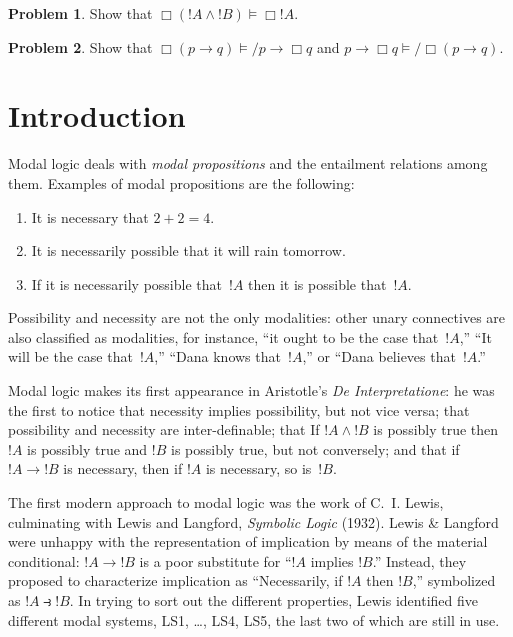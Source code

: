 \documentclass[10pt,a4paper]{article}
\theoremstyle{plain}
\theoremstyle{definition}
\newtheorem{prob}{Problem}[section]
\theoremstyle{remark}
\newcommand*{\olfileid}[3]{}
\newcommand*{\olsection}[1]{\section*{#1}}
\providecommand{\lif}{\mathbin{\rightarrow}}
\providecommand{\Entails}{\mathrel{\models}}
\providecommand{\Log}{\ensuremath{\mathrm{L}}}
\begin{document}
\begin{prob}
  Show that $\Box (!A \land !B) \Entails \Box !A$.
\end{prob}

\begin{prob}
  Show that $\Box (p \lif q) \Entails/ p \lif \Box q$ and $p \lif \Box
  q \Entails/\Box (p \lif q)$.
\end{prob}





\olfileid{nml}{syn}{int}

\olsection{Introduction}

Modal logic deals with \emph{modal propositions} and the entailment
relations among them. Examples of modal propositions are the
following:
\begin{enumerate}
\item It is necessary that $2+2=4$.
\item It is necessarily possible that it will rain tomorrow.
\item If it is necessarily possible that~$!A$ then it is possible
  that~$!A$.
\end{enumerate}
Possibility and necessity are not the only modalities: other unary
connectives are also classified as modalities, for instance, ``it
ought to be the case that~$!A$,'' ``It will be the case that~$!A$,''
``Dana knows that~$!A$,'' or ``Dana believes that~$!A$.''

Modal logic makes its first appearance in Aristotle's \emph{De
  Interpretatione}: he was the first to notice that necessity implies
possibility, but not vice versa; that possibility and necessity are
inter-definable; that If $!A \land !B$ is possibly true then
$!A$ is possibly true and $!B$ is possibly true, but not
conversely; and that if $!A \to !B$ is necessary, then if
$!A$ is necessary, so is~$!B$.

The first modern approach to modal logic was the work of C.~I. Lewis,
culminating with Lewis and Langford, \emph{Symbolic Logic}
(1932). Lewis \& Langford were unhappy with the representation of
implication by means of the material conditional: $!A \lif !B$
is a poor substitute for ``$!A$ implies $!B$.'' Instead, they
proposed to characterize implication as ``Necessarily, if $!A$
then $!B$,'' symbolized as $!A \strictif !B$. In trying to
sort out the different properties, Lewis identified five different
modal systems, \Log{S1}, \ldots, \Log{S4}, \Log{S5}, the last
two of which are still in use.
\end{document}

